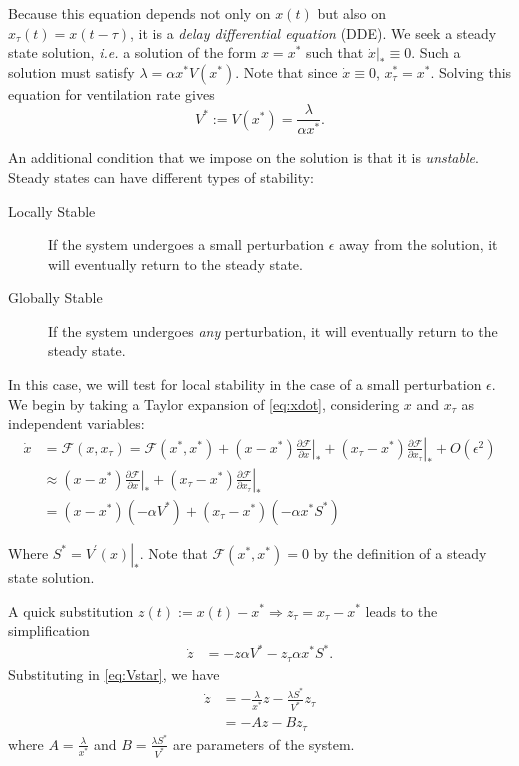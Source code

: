 Because this equation depends not only on $x(t)$ but also on $x_\tau(t) = x(t-\tau)$, it is a \emph{delay differential equation} (DDE). We seek a steady state solution, \emph{i.e.} a solution of the form $x= x^*$ such that $\left.\dot{x}\right|_*\equiv 0$. Such a solution must satisfy $\lambda = \alpha x^*V(x^*)$. Note that since $\dot{x}\equiv0$, $x_\tau^* = x^*$. Solving this equation for ventilation rate gives
\begin{equation}
  V^* := V(x^*) = \frac{\lambda}{\alpha x^*}.
  \label{eq:Vstar}
\end{equation}

An additional condition that we impose on the solution is that it is \emph{unstable}. Steady states can have different types of stability:
\begin{description}
  \item[Locally Stable] If the system undergoes a small perturbation $\epsilon$ away from the solution, it will eventually return to the steady state.
  \item[Globally Stable] If the system undergoes \emph{any} perturbation, it will eventually return to the steady state.
\end{description}

In this case, we will test for local stability in the case of a small perturbation $\epsilon$. We begin by taking a Taylor expansion of \eqref{eq:xdot}, considering $x$ and $x_\tau$ as independent variables:
\begin{align*}
  \dot{x} &= \mathscr{F}(x,x_\tau) = \mathscr{F}(x^*,x^*) + \left. (x-x^*)\frac{\partial{\mathscr{F}}}{\partial{x}} \right|_* + \left. (x_\tau-x^*)\frac{\partial{\mathscr{F}}}{\partial{x_\tau}} \right|_* + O\left( \epsilon^2 \right)\\
  &\approx  \left. (x-x^*)\frac{\partial{\mathscr{F}}}{\partial{x}} \right|_* + \left. (x_\tau-x^*)\frac{\partial{\mathscr{F}}}{\partial{x_\tau}} \right|_*\\
  &=(x-x^*)\left( -\alpha V^* \right) + (x_\tau-x^*)(-\alpha x^*S^*)
\end{align*}

Where $S^* = \left.V^\prime(x)\right|_*$. Note that $\mathscr{F}(x^*,x^*) = 0$ by the definition of a steady state solution. 

A quick substitution $z(t) := x(t)-x^*\Rightarrow z_\tau = x_\tau-x^*$ leads to the simplification
\begin{align*}
  \dot{z} &= -z \alpha V^* - z_\tau \alpha x^* S^*.
\end{align*}
Substituting in \eqref{eq:Vstar}, we have
\begin{align*}
  \dot{z} &= -\frac{\lambda}{x^*}z - \frac{\lambda S^*}{V^*}z_\tau\\
  &=-Az -Bz_\tau
\end{align*}
where $A = \frac{\lambda}{x^*}$ and $B = \frac{\lambda S^*}{V^*}$ are parameters of the system.

